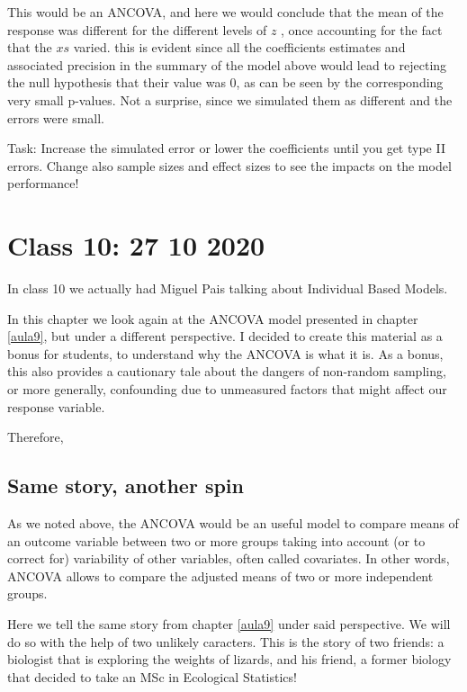 \documentclass[
]{book}
\begin{document}
This would be an ANCOVA, and here we would conclude that the mean of the response was different for the different levels of \(z\) , once accounting for the fact that the \(xs\) varied. this is evident since all the coefficients estimates and associated precision in the summary of the model above would lead to rejecting the null hypothesis that their value was 0, as can be seen by the corresponding very small p-values. Not a surprise, since we simulated them as different and the errors were small.

Task: Increase the simulated error or lower the coefficients until you get type II errors. Change also sample sizes and effect sizes to see the impacts on the model performance!

\hypertarget{aula10}{%
\chapter{Class 10: 27 10 2020}\label{aula10}}

In class 10 we actually had Miguel Pais talking about Individual Based Models.

In this chapter we look again at the ANCOVA model presented in chapter \ref{aula9}, but under a different perspective. I decided to create this material as a bonus for students, to understand why the ANCOVA is what it is. As a bonus, this also provides a cautionary tale about the dangers of non-random sampling, or more generally, confounding due to unmeasured factors that might affect our response variable.

Therefore,

\hypertarget{same-story-another-spin}{%
\section{Same story, another spin}\label{same-story-another-spin}}

As we noted above, the ANCOVA would be an useful model to compare means of an outcome variable between two or more groups taking into account (or to correct for) variability of other variables, often called covariates. In other words, ANCOVA allows to compare the adjusted means of two or more independent groups.

Here we tell the same story from chapter \ref{aula9} under said perspective. We will do so with the help of two unlikely caracters. This is the story of two friends: a biologist that is exploring the weights of lizards, and his friend, a former biology that decided to take an MSc in Ecological Statistics!
\end{document}
